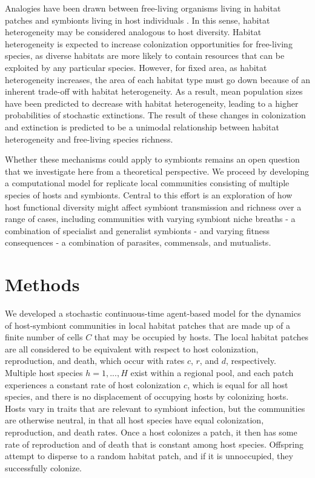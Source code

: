 \documentclass[12pt]{article}
\begin{document}
Analogies have been drawn between free-living organisms living in habitat patches and symbionts living in host individuals \citep{Mihaljevic2012}. 
In this sense, habitat heterogeneity may be considered analogous to host diversity. 
Habitat heterogeneity is expected to increase colonization opportunities for free-living species, as diverse habitats are more likely to contain resources that can be exploited by any particular species. 
However, for fixed area, as habitat heterogeneity increases, the area of each habitat type must go down because of an inherent trade-off with habitat heterogeneity. 
As a result, mean population sizes have been predicted to decrease with habitat heterogeneity, leading to a higher probabilities of stochastic extinctions. 
The result of these changes in colonization and extinction is predicted to be a unimodal relationship between habitat heterogeneity and free-living species richness. 

Whether these mechanisms could apply to symbionts remains an open question that we investigate here from a theoretical perspective. 
We proceed by developing a computational model for replicate local communities consisting of multiple species of hosts and symbionts. 
Central to this effort is an exploration of how host functional diversity might affect symbiont transmission and richness over a range of cases, including communities with varying symbiont niche breaths - a combination of specialist and generalist symbionts - and varying fitness consequences - a combination of parasites, commensals, and mutualists. 

\section*{Methods}

We developed a stochastic continuous-time agent-based model for the dynamics of host-symbiont communities in local habitat patches that are made up of a finite number of cells $C$ that may be occupied by hosts. 
The local habitat patches are all considered to be equivalent with respect to host colonization, reproduction, and death, which occur with rates $c$, $r$, and $d$, respectively. 
Multiple host species $h=1, ..., H$ exist within a regional pool, and each patch experiences a constant rate of host colonization $c$, which is equal for all host species, and there is no displacement of occupying hosts by colonizing hosts. 
Hosts vary in traits that are relevant to symbiont infection, but the communities are otherwise neutral, in that all host species have equal colonization, reproduction, and death rates. 
Once a host colonizes a patch, it then has some rate of reproduction and of death that is constant among host species.
Offspring attempt to disperse to a random habitat patch, and if it is unnoccupied, they successfully colonize.
\end{document}
